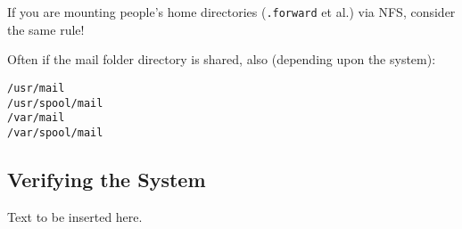 If you are mounting people's home directories ({\tt .forward} et al.)
via NFS, consider the same rule!

Often if the mail folder directory is shared, also (depending upon the system):
\begin{tscreen}
\begin{verbatim}
/usr/mail
/usr/spool/mail
/var/mail
/var/spool/mail
\end{verbatim}
\end{tscreen}





\subsection{Verifying the System}

Text to be inserted here.
